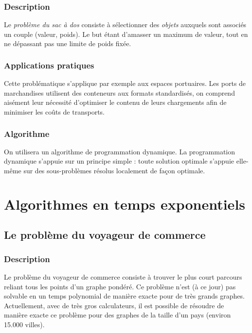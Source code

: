         \subsubsection{Description}
            Le \emph{problème du sac à dos} consiste à sélectionner
            des \emph{objets} auxquels sont associés un couple (valeur, poids).
            Le but étant d'amasser un maximum de valeur, tout en ne dépassant
            pas une limite de poids fixée.
        \subsubsection{Applications pratiques}
            Cette problématique s'applique par exemple aux espaces portuaires.
            Les ports de marchandises utilisent des conteneurs aux formats standardisés,
            on comprend aisément leur nécessité d'optimiser le contenu de leurs
            chargements afin de minimiser les coûts de transports.
        \subsubsection{Algorithme}
            On utilisera un algorithme de programmation dynamique. La programmation dynamique s'appuie sur un principe simple :
	    toute solution optimale s'appuie elle-même sur des sous-problèmes résolus localement de façon optimale.



\section{Algorithmes en temps exponentiels}
     \subsection{Le problème du voyageur de commerce}
        \subsubsection{Description}
                Le problème du voyageur de commerce consiste à trouver le plus
                court parcours reliant tous les points d'un graphe pondéré.
                Ce problème n'est (à ce jour) pas solvable en un temps
                polynomial de manière exacte pour de très grands graphes.
                Actuellement, avec de très gros calculateurs, il est possible
                de résoudre de manière exacte ce problème pour des graphes
                de la taille d'un pays (environ 15.000 villes).

